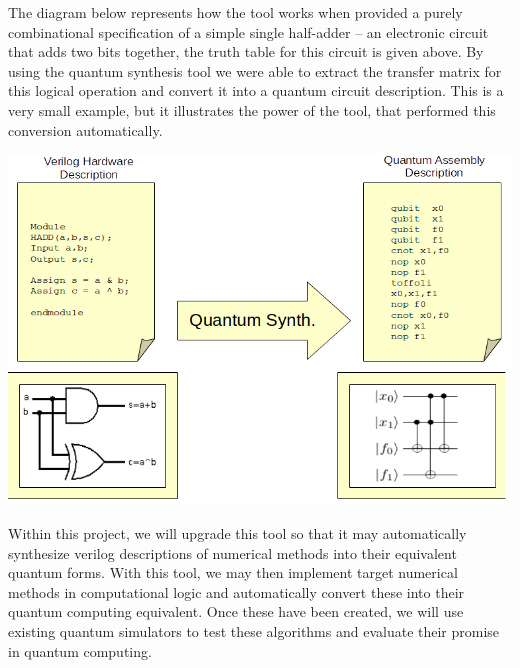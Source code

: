 The diagram below represents how the tool works when provided a purely
combinational specification of a simple single half-adder -- an
electronic circuit that adds two bits together, the 
truth table for this circuit is given above.  By using the quantum
synthesis tool we were able to extract the transfer matrix for this
logical operation and convert it into a quantum circuit
description.  This is a very small example, but it illustrates the
power of the tool, that performed this conversion automatically. 
\begin{center}
  \includegraphics[scale=0.55]{QuantumSynthesis.png}
\end{center}
Within this project, we will upgrade this tool
so that it may automatically synthesize verilog descriptions of
numerical methods into their equivalent quantum forms.  With this
tool, we may then implement target numerical methods in computational
logic and automatically convert these into their quantum computing
equivalent.  Once these have been created, we will use existing
quantum simulators to test these algorithms and evaluate their promise
in quantum computing. 

